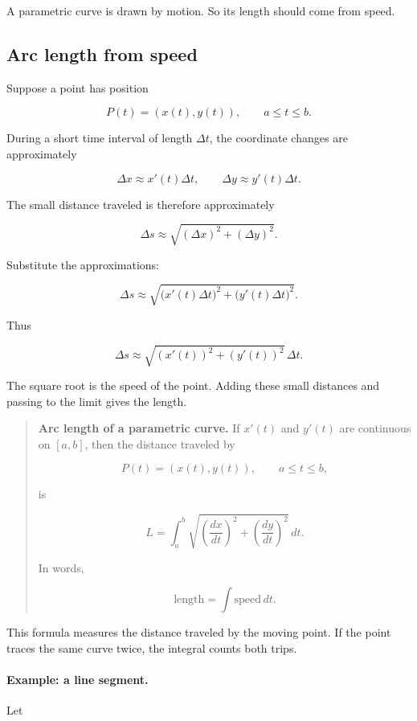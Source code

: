 A parametric curve is drawn by motion.  So its length should come from speed.

\subsection{Arc length from speed}
\label{subsec:parametric-arc-length-speed}

Suppose a point has position

\[
P(t)=(x(t),y(t)),
\qquad
a\le t\le b.
\]

During a short time interval of length \(\Delta t\), the coordinate changes are
approximately

\[
\Delta x\approx x'(t)\Delta t,
\qquad
\Delta y\approx y'(t)\Delta t.
\]

The small distance traveled is therefore approximately

\[
\Delta s
\approx
\sqrt{(\Delta x)^2+(\Delta y)^2}.
\]

Substitute the approximations:

\[
\Delta s
\approx
\sqrt{\bigl(x'(t)\Delta t\bigr)^2+\bigl(y'(t)\Delta t\bigr)^2}.
\]

Thus

\[
\Delta s
\approx
\sqrt{(x'(t))^2+(y'(t))^2}\,\Delta t.
\]

The square root is the speed of the point.  Adding these small distances and passing to
the limit gives the length.

\begin{quote}
\textbf{Arc length of a parametric curve.}
If \(x'(t)\) and \(y'(t)\) are continuous on \([a,b]\), then the distance traveled by

\[
P(t)=(x(t),y(t)),
\qquad
a\le t\le b,
\]

is

\[
\boxed{
L=\int_a^b
\sqrt{\left(\frac{dx}{dt}\right)^2+
      \left(\frac{dy}{dt}\right)^2}\,dt.
}
\]

In words,

\[
\boxed{
\text{length}=\int \text{speed}\,dt.
}
\]
\end{quote}

This formula measures the distance traveled by the moving point.  If the point traces
the same curve twice, the integral counts both trips.

\paragraph{Example: a line segment.}
Let

